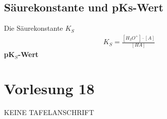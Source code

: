 \documentclass[a4paper,10pt]{article}
\begin{document}
\subsection{Säurekonstante und pKs-Wert}
Die Säurekonstante $K_S$
\pp
\begin{align*}
K_S = \frac{[H_3O^+]\cdot [A]}{[HA]}
\end{align*}
\textbf{pK$_S$-Wert} \par 
{}

\section*{Vorlesung 18}
KEINE TAFELANSCHRIFT

\end{document}
